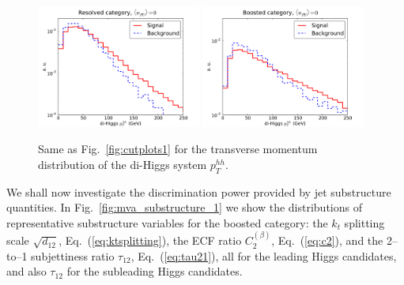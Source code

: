 \begin{figure}[t]
\begin{center}
  \includegraphics[width=0.48\textwidth]{plots/pt_HH_C2_res_noPU.pdf}
  \includegraphics[width=0.48\textwidth]{plots/pt_HH_C2_bst_noPU.pdf}
  \caption{\small Same as Fig.~\ref{fig:cutplots1} for the transverse momentum
    distribution of the di-Higgs system $p_T^{hh}$.
}
\label{fig:pthh}
\end{center}
\end{figure}

We shall now investigate the discrimination power
provided by jet substructure
quantities.
%
In Fig.~\ref{fig:mva_substructure_1}
we show the distributions of representative
 substructure variables for the boosted category: the
$k_t$ splitting scale $\sqrt{d_{12}}$, Eq.~(\ref{eq:ktsplitting}), 
the ECF ratio $C_2^{(\beta)}$,
Eq.~(\ref{eq:c2}), and
the 2--to--1 subjettiness ratio $\tau_{12}$, Eq.~(\ref{eq:tau21}),
all for the leading
Higgs candidates, and also $\tau_{12}$ for the subleading
Higgs candidates.

